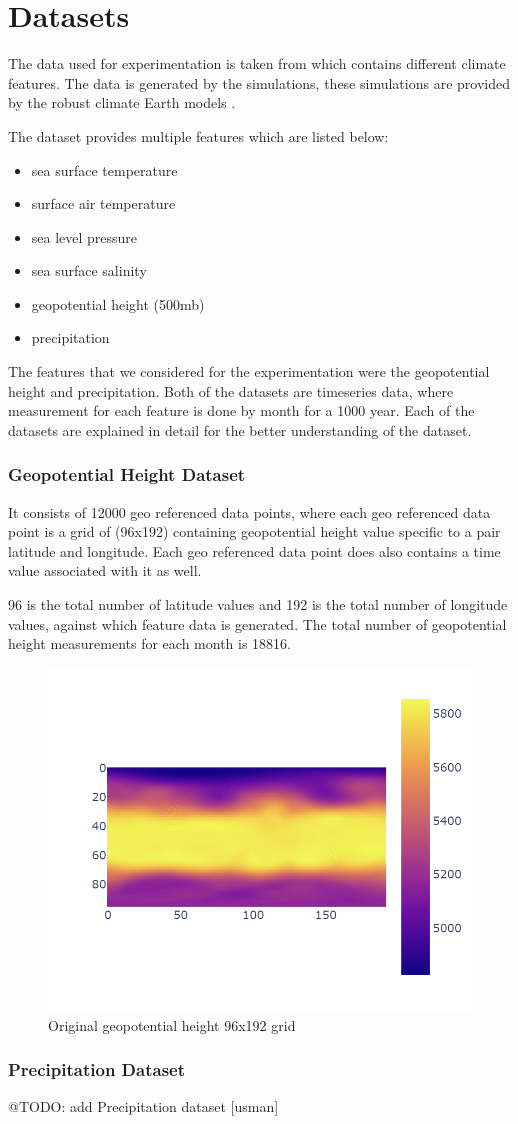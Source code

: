 
\clearpage
\cleardoublepage

\chapter{Datasets}
\label{chap:dataset}

The data used for experimentation is taken from \cite{willi_rath_2023_7779883} which contains different climate features. The data is generated by the simulations, these simulations are provided by the robust climate Earth models \cite{willi_rath_2023_7779883}.

The dataset provides multiple features which are listed below:
\begin{itemize}
    \item sea surface temperature
    \item surface air temperature
    \item sea level pressure
    \item sea surface salinity
    \item geopotential height (500mb)
    \item precipitation
\end{itemize}

The features that we considered for the experimentation were the geopotential height and precipitation.
Both of the datasets are timeseries data, where measurement for each feature is done by month for a 1000 year. Each of the datasets are explained in detail for the better understanding of the dataset.
\newpage
\subsection{Geopotential Height Dataset}
It consists of 12000 geo referenced data points, where each geo referenced data point is a grid of (96x192) containing geopotential height value specific to a pair latitude and longitude.
Each geo referenced data point does also contains a time value associated with it as well.

96  is the total number of latitude values and  192 is the total number of longitude values, against which feature data is generated. The total number of geopotential height measurements for each month is 18816.

\begin{figure}[h]
    \centering
    \includegraphics[width=0.6\linewidth]{figures/chapter-5/data_original.png}
    \caption{Original geopotential height 96x192 grid }
    \label{fig:org_geopoth}
\end{figure}

\subsection{Precipitation Dataset}

@TODO: add Precipitation dataset [usman]